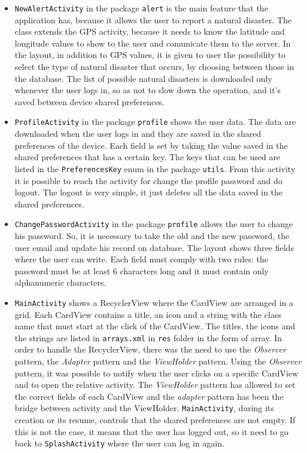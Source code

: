 \documentclass[a4paper,12pt]{report}
\begin{document}
\begin{itemize}
\item \texttt{NewAlertActivity} in the package \texttt{alert} is the main feature that the application has, because it allows the user to report a natural disaster. The class extends the GPS activity, because it needs to know the latitude and longitude values to show to the user and comunicate them to the server. In the layout, in addition to GPS values, it is given to user the possibility to select the type of natural disaster that occurs, by choosing between those in the database. The list of possible natural disasters is downloaded only whenever the user logs in, so as not to slow down the operation, and it's saved between device shared preferences.
\item \texttt{ProfileActivity} in the package \texttt{profile} shows the user data. The data are downloaded when the user logs in and they are saved in the shared preferences of the device. Each field is set by taking the value saved in the shared preferences that has a certain key. The keys that can be used are listed in the \texttt{PreferencesKey} enum in the package \texttt{utils}. From this activity it is possible to reach the activity for change the profile password and do logout. The logout is very simple, it just deletes all the data saved in the shared preferences.
\item \texttt{ChangePasswordActivity} in the package \texttt{profile} allows the user to change his password. So, it is necessary to take the old and the new password, the user email and update his record on database. The layout shows three fields where the user can write. Each field must comply with two rules: the password must be at least 6 characters long and it must contain only alphanumeric characters.
\item \texttt{MainActivity} shows a RecyclerView where the CardView are arranged in a grid. Each CardView contains a title, an icon and a string with the class name that must start at the click of the CardView. The titles, the icons and the strings are listed in \texttt{arrays.xml} in \texttt{res} folder in the form of array. In order to handle the RecyclerView, there was the need to use the \emph{Observer} pattern, the \emph{Adapter} pattern and the \emph{ViewHolder} pattern. Using the \emph{Observer} pattern, it was possible to notify when the user clicks on a specific CardView and to open the relative activity. The \emph{ViewHolder} pattern has allowed to set the correct fields of each CardView and the \emph{adapter} pattern has been the bridge between activity and the ViewHolder. \texttt{MainActivity}, during its creation or its resume, controls that the shared preferences are not empty. If this is not the case, it means that the user has logged out, so it need to go back to \texttt{SplashActivity} where the user can log in again.
\end{itemize}
\end{document}
